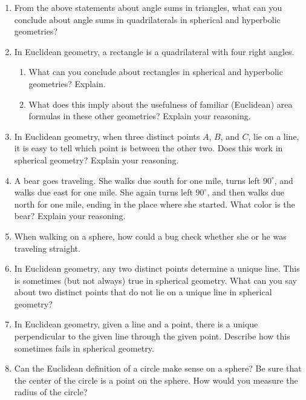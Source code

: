 \begin{problems}

\begin{enumerate}

\item From the above statements about angle sums in triangles, what can you conclude about angle sums in quadrilaterals  in spherical and hyperbolic geometries?

\item In Euclidean geometry, a rectangle is a quadrilateral with four right angles. 
\begin{enumerate}
\item What can you conclude about rectangles in spherical and hyperbolic geometries?  Explain.  
\item What does this imply about the usefulness of familiar (Euclidean) area formulas in these other geometries?  Explain your reasoning. 
\end{enumerate} 

\item In Euclidean geometry, when three distinct points $A$, $B$, and $C$, lie on a line, it is easy to tell which point is between the other two.  Does this work in spherical geometry?  Explain your reasoning.  

\item A bear goes traveling.  She walks due south for one mile, turns left $90^\circ$, and walks due east for one mile.  She again turns left $90^\circ$, and then walks due north for one mile, ending in the place where she started.  What color is the bear?  Explain your reasoning.  

\item When walking on a sphere, how could a bug check whether she or he was traveling straight.  

\item In Euclidean geometry, any two distinct points determine a unique line.  This is sometimes (but not always) true in spherical geometry.  What can you say about two distinct points that do not lie on a unique line in spherical geometry?  

\item In Euclidean geometry, given a line and a point, there is a unique perpendicular to the given line through the given point.  Describe how this sometimes fails in spherical geometry.  

\item Can the Euclidean definition of a circle make sense on a sphere?  Be sure that the center of the circle is a point on the sphere.  How would you measure the radius of the circle?  


\end{enumerate}
\end{problems}
